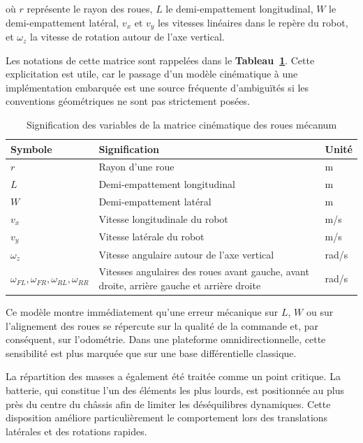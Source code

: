 \documentclass[11pt,a4paper]{report}
\newcommand{\kw}[1]{\textbf{#1}}
\begin{document}
où \(r\) représente le rayon des roues, \(L\) le demi-empattement longitudinal, \(W\) le demi-empattement latéral, \(v_x\) et \(v_y\) les vitesses linéaires dans le repère du robot, et \(\omega_z\) la vitesse de rotation autour de l’axe vertical.

Les notations de cette matrice sont rappelées dans le \kw{Tableau~\ref{tab:variables_mecanum}}. Cette explicitation est utile, car le passage d’un modèle cinématique à une implémentation embarquée est une source fréquente d’ambiguïtés si les conventions géométriques ne sont pas strictement posées.

\begin{table}[H]
\centering
\renewcommand{\arraystretch}{1.2}
\begin{tabular}{|p{2.5cm}|p{8.3cm}|p{2.2cm}|}
\hline
\textbf{Symbole} & \textbf{Signification} & \textbf{Unité} \\
\hline
\(r\) & Rayon d’une roue & m \\
\hline
\(L\) & Demi-empattement longitudinal & m \\
\hline
\(W\) & Demi-empattement latéral & m \\
\hline
\(v_x\) & Vitesse longitudinale du robot & m/s \\
\hline
\(v_y\) & Vitesse latérale du robot & m/s \\
\hline
\(\omega_z\) & Vitesse angulaire autour de l’axe vertical & rad/s \\
\hline
\(\omega_{FL}, \omega_{FR}, \omega_{RL}, \omega_{RR}\) & Vitesses angulaires des roues avant gauche, avant droite, arrière gauche et arrière droite & rad/s \\
\hline
\end{tabular}
\caption{Signification des variables de la matrice cinématique des roues mécanum}
\label{tab:variables_mecanum}
\end{table}

Ce modèle montre immédiatement qu’une erreur mécanique sur \(L\), \(W\) ou sur l’alignement des roues se répercute sur la qualité de la commande et, par conséquent, sur l’odométrie. Dans une plateforme omnidirectionnelle, cette sensibilité est plus marquée que sur une base différentielle classique.

La répartition des masses a également été traitée comme un point critique. La batterie, qui constitue l’un des éléments les plus lourds, est positionnée au plus près du centre du châssis afin de limiter les déséquilibres dynamiques. Cette disposition améliore particulièrement le comportement lors des translations latérales et des rotations rapides.
\end{document}
